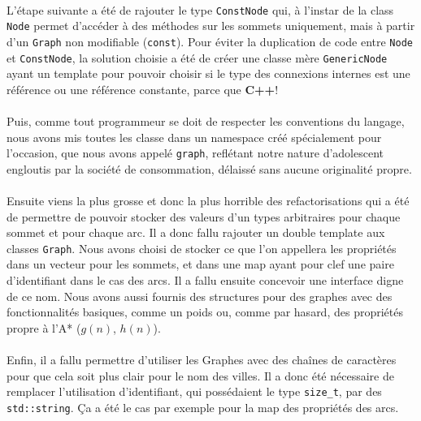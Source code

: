 \documentclass[french]{article}
\begin{document}
\paragraph{} L'étape suivante a été de rajouter le type \texttt{ConstNode} qui,
à l'instar de la class \texttt{Node} permet d'accéder à des méthodes sur les
sommets uniquement, mais à partir d'un \texttt{Graph} non modifiable
(\texttt{const}). Pour éviter la duplication de code entre
\texttt{Node} et \texttt{ConstNode}, la solution choisie a été de créer une
classe mère \texttt{GenericNode} ayant un template pour pouvoir choisir si le
type des connexions internes est une référence ou une référence constante,
parce que \textbf{C++}!

\paragraph{} Puis, comme tout programmeur se doit de respecter les conventions
du langage, nous avons mis toutes les classe dans un namespace créé
spécialement pour l'occasion, que nous avons appelé \texttt{graph}, reflétant
notre nature d'adolescent engloutis par la société de consommation, délaissé
sans aucune originalité propre.

\paragraph{} Ensuite viens la plus grosse et donc la plus horrible des
refactorisations qui a été de permettre de pouvoir stocker des valeurs d'un
types arbitraires pour chaque sommet et pour chaque arc. Il a donc fallu
rajouter un double template aux classes \texttt{Graph}. Nous avons choisi de
stocker ce que l'on appellera les propriétés dans un vecteur pour les sommets,
et dans une map ayant pour clef une paire d'identifiant dans le cas des arcs.
Il a fallu ensuite concevoir une interface digne de ce nom. Nous avons aussi
fournis des structures pour des graphes avec des fonctionnalités basiques,
comme un poids ou, comme par hasard, des propriétés propre à l'A* ($g(n)$,
$h(n)$).

\paragraph{} Enfin, il a fallu permettre d'utiliser les Graphes avec des
chaînes de caractères pour que cela soit plus clair pour le nom des villes. Il
a donc été nécessaire de remplacer l'utilisation d'identifiant, qui possédaient
le type \texttt{size_t}, par des \texttt{std::string}. Ça a
été le cas par exemple pour la map des propriétés des arcs.
\end{document}

